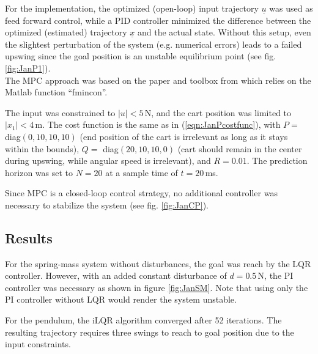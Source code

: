 \documentclass[letterpaper, 10 pt, conference]{ieeeconf}  %
\begin{document}
For the implementation, the optimized (open-loop) input trajectory $\underline{u}$ was used as feed forward control, while a PID controller minimized the difference between the optimized (estimated) trajectory $\underline{x}$ and the actual state.
Without this setup, even the slightest perturbation of the system (e.g. numerical errors) leads to a failed upswing since the goal position is an unstable equilibrium point (see fig. \ref{fig:JanP1}).\\

The MPC approach was based on the paper and toolbox from \cite{Opti_MPC} which relies on the Matlab function ``fmincon''.

The input was constrained to $|u|<5$\,N, and the cart position was limited to $|x_1|<4$\,m. The cost function is the same as in (\ref{eqn:JanPcostfunc}), with $P=$ diag$(0,10,10,10)$ (end position of the cart is irrelevant as long as it stays within the bounds), $Q=$ diag$(20,10,10,0)$ (cart should remain in the center during upswing, while angular speed is irrelevant), and $R=0.01$. The prediction horizon was set to $N=20$ at a sample time of $t=20$\,ms.

Since MPC is a closed-loop control strategy, no additional controller was necessary to stabilize the system (see fig. \ref{fig:JanCP}).
\subsection{Results}
For the spring-mass system without disturbances, the goal was reach by the LQR controller. However, with an added constant disturbance of $d=0.5$\,N, the PI controller was necessary as shown in figure \ref{fig:JanSM}. Note that using only the PI controller without LQR would render the system unstable.

For the pendulum, the iLQR algorithm converged after 52 iterations. The resulting trajectory requires three swings to reach to goal position due to the input constraints. 
\end{document}
